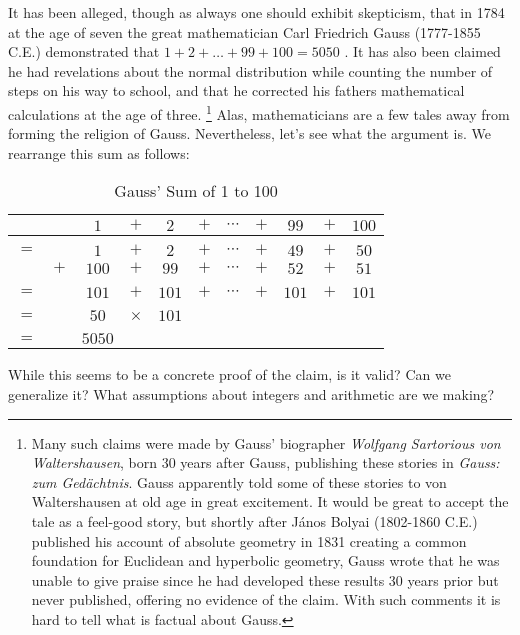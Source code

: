     \begin{example}
        \label{ex:Logic_Gauss_Sum}%
        It has been alleged, though as always one should exhibit skepticism,
        that in 1784 at the age of seven the great mathematician Carl
        Friedrich Gauss (1777-1855 C.E.)
        demonstrated that $1+2+\dots+99+100=5050$ \cite[p.~12-13]{von1856gauss}.
        It has also been claimed he had revelations about the normal
        distribution while counting the number of steps on his way to school,
        and that he corrected his fathers mathematical calculations at the age
        of three.%
        \footnote{%
            Many such claims were made by Gauss' biographer
            \textit{Wolfgang Sartorious von Waltershausen}, born 30 years after
            Gauss, publishing these stories in
            \textit{Gauss: zum Ged\"{a}chtnis}. Gauss apparently told some of
            these stories to von Waltershausen at old age in great excitement.
            It would be great to accept the tale as a feel-good story, but
            shortly after J\'{a}nos Bolyai
            (1802-1860 C.E.) published his account of
            absolute geometry in 1831 creating a common foundation for Euclidean
            and hyperbolic geometry, Gauss wrote that he was unable to give
            praise since he had developed these results 30 years prior but
            never published, offering no evidence of the claim. With such
            comments it is hard to tell what is factual about Gauss.
        }
        Alas, mathematicians are a few tales away from forming the religion of
        Gauss. Nevertheless, let's see what the argument is. We rearrange this
        sum as follows:
        \begin{table}[H]
            \centering
            \captionsetup{type=table}
            \begin{tabular}{ccccccccccc}
                &&$1$&$+$&$2$&$+$&$\cdots$&$+$&$99$&$+$&$100$\\
                \hline\\
                $=$&&$1$&$+$&$2$&$+$&$\cdots$&$+$&$49$&$+$&$50$\\
                &$+$&$100$&$+$&$99$&$+$&$\cdots$&$+$&$52$&$+$&$51$\\
                \hline\\
                $=$&&$101$&$+$&$101$&$+$&$\cdots$&$+$&$101$&$+$&$101$\\
                \hline\\
                $=$&&$50$&$\times$&$101$\\
                \hline\\
                $=$&&$5050$
            \end{tabular}
            \caption{Gauss' Sum of 1 to 100}
        \end{table}
        While this seems to be a concrete proof of the claim, is it valid? Can
        we generalize it? What assumptions about integers and arithmetic are we
        making?
    \end{example}
